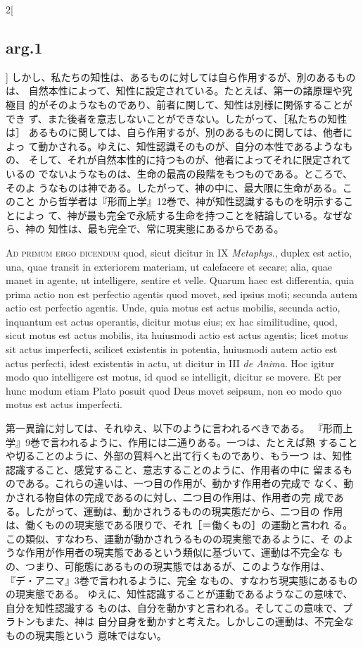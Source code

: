 \documentclass[paper=a4paper,fontsize=10pt,jafontsize=9pt,titlepage]{jlreq}
\begin{document}
\begin{paracol}{2}[\subsection{arg.1}]
しかし、私たちの知性は、あるものに対しては自ら作用するが、別のあるものは、
 自然本性によって、知性に設定されている。たとえば、第一の諸原理や究極目
 的がそのようなものであり、前者に関して、知性は別様に関係することができ
 ず、また後者を意志しないことができない。したがって、［私たちの知性は］
 あるものに関しては、自ら作用するが、別のあるものに関しては、他者によっ
 て動かされる。ゆえに、知性認識そのものが、自分の本性であるようなもの、
 そして、それが自然本性的に持つものが、他者によってそれに限定されているの
 でないようなものは、生命の最高の段階をもつものである。ところで、そのよ
 うなものは神である。したがって、神の中に、最大限に生命がある。このこと
 から哲学者は『形而上学』12巻で、神が知性認識するものを明示することによっ
 て、神が最も完全で永続する生命を持つことを結論している。なぜなら、神の
 知性は、最も完全で、常に現実態にあるからである。

\switchcolumn*[\subsection{ad.1}]


{\scshape Ad primum ergo dicendum} quod, sicut dicitur in IX {\itshape Metaphys}.,
duplex est actio, una, quae transit in exteriorem materiam, ut
calefacere et secare; alia, quae manet in agente, ut intelligere,
sentire et velle. Quarum haec est differentia, quia prima actio non est
perfectio agentis quod movet, sed ipsius moti; secunda autem actio est
perfectio agentis. Unde, quia motus est actus mobilis, secunda actio,
inquantum est actus operantis, dicitur motus eius; ex hac similitudine,
quod, sicut motus est actus mobilis, ita huiusmodi actio est actus
agentis; licet motus sit actus imperfecti, scilicet existentis in
potentia, huiusmodi autem actio est actus perfecti, idest existentis in
actu, ut dicitur in III {\itshape de Anima}. Hoc igitur modo quo intelligere est
motus, id quod se intelligit, dicitur se movere. Et per hunc modum etiam
Plato posuit quod Deus movet seipsum, non eo modo quo motus est actus
imperfecti.

\switchcolumn

第一異論に対しては、それゆえ、以下のように言われるべきである。
『形而上学』9巻で言われるように、作用には二通りある。一つは、たとえば熱
 することや切ることのように、外部の質料へと出て行くものであり、もう一つ
 は、知性認識すること、感覚すること、意志することのように、作用者の中に
 留まるものである。これらの違いは、一つ目の作用が、動かす作用者の完成で
 なく、動かされる物自体の完成であるのに対し、二つ目の作用は、作用者の完
 成である。したがって、運動は、動かされうるものの現実態だから、二つ目の
 作用は、働くものの現実態である限りで、それ［＝働くもの］の運動と言われ
 る。この類似、すなわち、運動が動かされうるものの現実態であるように、そ
 のような作用が作用者の現実態であるという類似に基づいて、運動は不完全な
 もの、つまり、可能態にあるものの現実態ではあるが、このような作用は、
 『デ・アニマ』3巻で言われるように、完全
 なもの、すなわち現実態にあるものの現実態である。
ゆえに、知性認識することが運動であるようなこの意味で、自分を知性認識する
 ものは、自分を動かすと言われる。そしてこの意味で、プラトンもまた、神は
 自分自身を動かすと考えた。しかしこの運動は、不完全なものの現実態という
 意味ではない。


\end{paracol}
\end{document}
